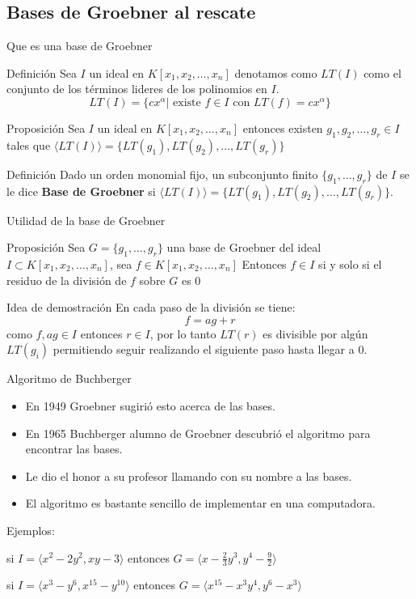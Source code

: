 \documentclass[10pt]{beamer}
\newcommand{\gen}[1]{\ensuremath{\langle #1\rangle}}
\begin{document}
\subsection{Bases de Groebner al rescate}

\begin{frame}{Que es una base de Groebner}
	\begin{block}{Definición}
		Sea $I$ un ideal en $K[x_1,x_2,\ldots,x_n]$ denotamos como $LT(I)$ como el conjunto de los términos lideres de los polinomios en $I$.
		$$LT(I) = \{cx^{\alpha} | \text{ existe } f \in I \text{ con } LT(f)=cx^{\alpha} \}$$
	\end{block}
	\pause
	\begin{block}{Proposición}
	Sea $I$ un ideal en $K[x_1,x_2,\ldots,x_n]$ entonces existen $g_1,g_2,\ldots,g_r \in I$ tales que
	$\gen{LT(I)} = \{ LT(g_1), LT(g_2), \ldots, LT(g_r)\}$
	\end{block}
	\pause
	\begin{block}{Definición}
		Dado un orden monomial fijo, un subconjunto finito $\{g_1,\ldots,g_r\}$ de $I$ se le dice \textbf{Base de Groebner} si $\gen{LT(I)} = \{ LT(g_1), LT(g_2), \ldots, LT(g_r)\}$.
	\end{block}
\end{frame}

\begin{frame}{Utilidad de la base de Groebner}
	\begin{block}{Proposición}
		Sea  $G=\{g_1,\ldots,g_r\}$ una base de Groebner del ideal $I \subset K[x_1,x_2,\ldots,x_n]$, sea $f \in K[x_1,x_2,\ldots,x_n]$ Entonces $f \in I$ si y solo si el residuo de la división de $f$ sobre $G$ es $0$
	\end{block}
	\pause
	\begin{block}{Idea de demostración}
		En cada paso de la división se tiene: $$f = ag + r$$como $f, ag \in I$ entonces $r \in I$, por lo tanto $LT(r)$ es divisible por algún $LT(g_i)$ permitiendo seguir realizando el siguiente paso hasta llegar a $0$.
	\end{block}
\end{frame}

\begin{frame}{Algoritmo de Buchberger}
	\begin{itemize}
		\item En 1949 Groebner sugirió esto acerca de las bases.
		\item En 1965 Buchberger alumno de Groebner descubrió el algoritmo para encontrar las bases.
		\item Le dio el honor a su profesor llamando con su nombre a las bases.
		\item El algoritmo es bastante sencillo de implementar en una computadora.
	\end{itemize}

	\pause
	Ejemplos:
	
	si $I = \gen{x^2 - 2y^2, xy - 3}$ entonces $G=\gen{x - \frac{2}{3}y^3, y^4 - \frac{9}{2}}$
	
	si $I=\gen{x^3-y^6, x^{15}-y^{10}}$ entonces $G=\gen{x^{15} - x^3y^4, y^6 - x^3}$
\end{frame}
\end{document}
